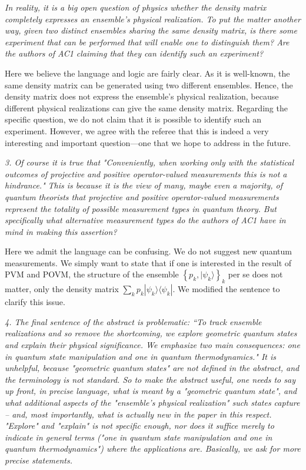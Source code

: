\documentclass{article}
\newcommand{\ket}[1]{| #1 \rangle}
\newcommand{\bra}[1]{\langle #1 |}
\newcommand{\REVIEW}[1]{{ \it \textcolor{reviewblack}{#1}}}
\newcommand{\REPLY}[1]{\textcolor{UCDBlue}{#1}}
\begin{document}
\REVIEW{In reality, it is a big open question of physics whether the density matrix completely expresses an 
ensemble's physical realization. To put the matter another way, given two distinct ensembles sharing the same 
density matrix, is there some experiment that can be performed that will enable one to distinguish them? Are 
the authors of AC1 claiming that they can identify such an experiment?}

\REPLY{Here we believe the language and logic are fairly clear. As it is well-known, 
the same density matrix can be generated using two different ensembles. Hence, the density matrix does not
express the ensemble's physical realization, because different physical realizations can give the same
density matrix. Regarding the specific question, we do not claim that it is possible to identify such an
experiment. However, we agree with the referee that this is indeed a very interesting and important question---one
that we hope to address in the future.}


\REVIEW{3. Of course it is true that}
\REVIEW{"Conveniently, when working only with the statistical outcomes of projective and positive operator-valued 
measurements this is not a hindrance."}
\REVIEW{This is because it is the view of many, maybe even a majority, of quantum theorists that projective and 
positive operator-valued measurements represent the totality of possible measurement types in quantum theory. 
But specifically what alternative measurement types do the authors of AC1 have in mind in making this assertion?
}

\REPLY{Here we admit the language can be confusing. We do not suggest new quantum measurements. We 
simply want to state that if one is interested in the result of PVM and POVM, the structure of the ensemble $\left\{ p_k ,\ket{\psi_k}\right\}_k$
per se does not matter, only the density matrix $\sum_k p_k \ket{\psi_k}\!\bra{\psi_k}$. We modified the sentence
to clarify this issue.} 

\REVIEW{
4. The final sentence of the abstract is problematic:
``To track ensemble realizations and so remove the shortcoming, we explore geometric quantum states and explain their physical significance. We emphasize two main consequences: one in quantum state manipulation and one in quantum thermodynamics."
It is unhelpful, because "geometric quantum states" are not defined in the abstract, and the terminology is not standard.
So to make the abstract useful, one needs to say up front, in precise language, what is meant by a "geometric quantum state", and what additional aspects of the "ensemble’s physical realization" such states capture
-- and, most importantly, what is actually new in the paper in this respect.
"Explore" and "explain" is not specific enough, nor does it suffice merely to indicate in general terms ("one in quantum state manipulation and one in quantum thermodynamics") where the applications are.
Basically, we ask for more precise statements.
}
\end{document}
